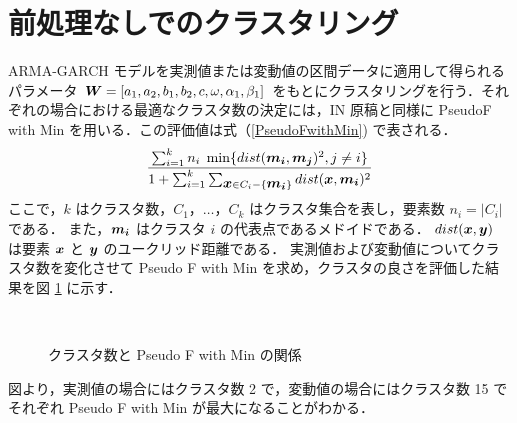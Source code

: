 \documentclass[a4j]{jarticle}
\def \vector#1{\mbox{\boldmath $#1$}}
\begin{document}
\section{前処理なしでのクラスタリング}
 ARMA-GARCH モデルを実測値または変動値の区間データに適用して得られるパラメータ $\vector{W} = [a_1, a_2, b_1, b_2, c, \omega, \alpha_1, \beta_1]$ をもとにクラスタリングを行う．それぞれの場合における最適なクラスタ数の決定には，IN 原稿と同様に PseudoF with Min を用いる．この評価値は式（\ref{PseudoFwithMin}) で表される．
 \begin{equation}
\frac{\sum^k_{i=1} n_{i}\hspace{0.1cm} \min \{ dist(\vector{m_{i}},\vector{m_j})^2,j \neq i \}}{1 + \sum^k_{i=1} \sum_{\vector{x} \in C_i - \{\vector{m_i}\}} dist(\vector{x},\vector{m_{i}})^2}
\label{PseudoFwithMin}
\end{equation}
ここで，$k$ はクラスタ数，$C_1，\ldots，C_k$ はクラスタ集合を表し，要素数 $n_i=|C_i|$ である．
また，$\vector{m_i}$ はクラスタ $i$ の代表点であるメドイドである．
$dist(\vector{x},\vector{y})$ は要素 $\vector{x}$ と $\vector{y}$ のユークリッド距離である．
実測値および変動値についてクラスタ数を変化させて Pseudo F with Min を求め，クラスタの良さを評価した結果を図 \ref{PseudoFwithMinPlot} に示す．
\begin{figure}[tb]
\begin{center}
~
\caption{クラスタ数と Pseudo F with Min の関係}
\label{PseudoFwithMinPlot}
\end{center}
\end{figure}
図より，実測値の場合にはクラスタ数 2 で，変動値の場合にはクラスタ数 15 でそれぞれ Pseudo F with Min が最大になることがわかる．
\end{document}
